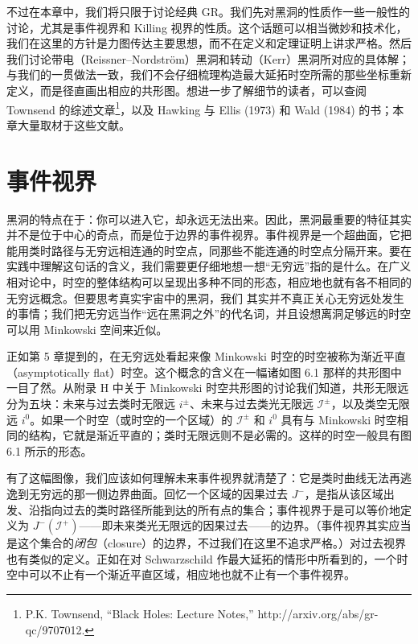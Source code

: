不过在本章中，我们将只限于讨论经典 GR。我们先对黑洞的性质作一些一般性的讨论，尤其是事件视界和 Killing 视界的性质。这个话题可以相当微妙和技术化，我们在这里的方针是力图传达主要思想，而不在定义和定理证明上讲求严格。然后我们讨论带电（Reissner–Nordström）黑洞和转动（Kerr）黑洞所对应的具体解；与我们的一贯做法一致，我们不会仔细梳理构造最大延拓时空所需的那些坐标重新定义，而是径直画出相应的共形图。想进一步了解细节的读者，可以查阅 Townsend 的综述文章\footnote{P.K. Townsend, “Black Holes: Lecture Notes,” http://arxiv.org/abs/gr-qc/9707012.}，以及 Hawking 与 Ellis (1973) 和 Wald (1984) 的书；本章大量取材于这些文献。

\section{事件视界}

黑洞的特点在于：你可以进入它，却永远无法出来。因此，黑洞最重要的特征其实并不是位于中心的奇点，而是位于边界的事件视界。事件视界是一个超曲面，它把能用类时路径与无穷远相连通的时空点，同那些不能连通的时空点分隔开来。要在实践中理解这句话的含义，我们需要更仔细地想一想“无穷远”指的是什么。在广义相对论中，时空的整体结构可以呈现出多种不同的形态，相应地也就有各不相同的无穷远概念。但要思考真实宇宙中的黑洞，我们
其实并不真正关心无穷远处发生的事情；我们把无穷远当作“远在黑洞之外”的代名词，并且设想离洞足够远的时空可以用 Minkowski 空间来近似。

正如第 5 章提到的，在无穷远处看起来像 Minkowski 时空的时空被称为渐近平直（asymptotically flat）时空。这个概念的含义在一幅诸如图 6.1 那样的共形图中一目了然。从附录 H 中关于 Minkowski 时空共形图的讨论我们知道，共形无限远分为五块：未来与过去类时无限远 $i^{\pm}$、未来与过去类光无限远 $\mathscr{I}^{\pm}$，以及类空无限远 $i^{0}$。如果一个时空（或时空的一个区域）的 $\mathscr{I}^{\pm}$ 和 $i^{0}$ 具有与 Minkowski 时空相同的结构，它就是渐近平直的；类时无限远则不是必需的。这样的时空一般具有图 6.1 所示的形态。

有了这幅图像，我们应该如何理解未来事件视界就清楚了：它是类时曲线无法再逃逸到无穷远的那一侧边界曲面。回忆一个区域的因果过去 $J^{-}$，是指从该区域出发、沿指向过去的类时路径所能到达的所有点的集合；事件视界于是可以等价地定义为 $J^{-}(\mathscr{I}^{+})$——即未来类光无限远的因果过去——的边界。（事件视界其实应当是这个集合的\emph{闭包}（closure）的边界，不过我们在这里不追求严格。）对过去视界也有类似的定义。正如在对 Schwarzschild 作最大延拓的情形中所看到的，一个时空中可以不止有一个渐近平直区域，相应地也就不止有一个事件视界。


